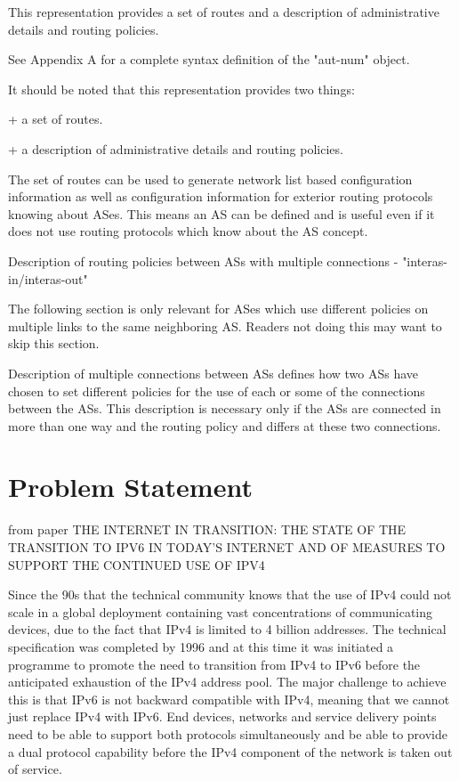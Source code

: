 \documentclass[11pt,a4paper]{scrreprt}
\begin{document}
This representation provides a set of routes and a description of administrative details and routing policies. 
        
        
          
          
          
          


	See Appendix A for a complete syntax definition of the "aut-num"
   object.


   It should be noted that this representation provides two things:

       + a set of routes.

       + a description of administrative details and routing policies.

   The set of routes can be used to generate network list based
   configuration information as well as configuration information for
   exterior routing protocols knowing about ASes. This means an AS can
   be defined and is useful even if it does not use routing protocols
   which know about the AS concept.

   Description of routing policies between ASs with multiple connections
   - "interas-in/interas-out"

   The following section is only relevant for ASes which use different
   policies on multiple links to the same neighboring AS. Readers not
   doing this may want to skip this section.

   Description of multiple connections between ASs defines how two ASs
   have chosen to set different policies for the use of each or some of
   the connections between the ASs.  This description is necessary only
   if the ASs are connected in more than one way and the routing policy
   and differs at these two connections.

\chapter{Problem Statement}

from paper THE INTERNET IN TRANSITION: THE STATE OF THE TRANSITION TO IPV6 IN
TODAY'S INTERNET AND OF MEASURES TO SUPPORT THE CONTINUED USE OF
IPV4

Since the 90s that the technical community knows that the use of IPv4 could not scale in a global deployment containing vast concentrations of communicating devices, due to the fact that IPv4 is limited to 4 billion addresses. The technical specification was completed by 1996 and at this time it was initiated a programme to promote the need to transition from IPv4 to IPv6 before the anticipated exhaustion of the IPv4 address pool. The major challenge to achieve this is that IPv6 is not backward compatible with IPv4, meaning that we cannot just replace IPv4 with IPv6. End devices, networks and service delivery points need to be able to support both protocols simultaneously and be able to provide a dual protocol capability before the IPv4 component of the network is taken out of service.     
\end{document}
